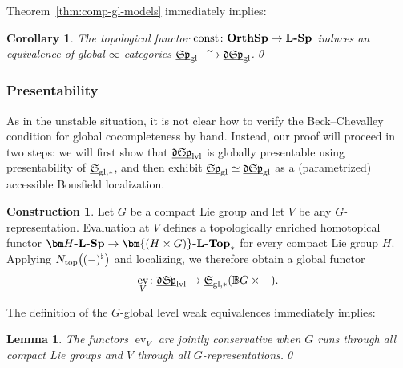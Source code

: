 \documentclass[reqno]{memo-l}
\theoremstyle{mythm}
\newtheorem{lemma}[thm]{Lemma}
\newtheorem{cor}[thm]{Corollary}
\theoremstyle{definition}
\newtheorem{constr}[thm]{Construction}
\numberwithin{equation}{section}
\newcommand{\gl}{\textup{gl}}
\DeclareMathOperator{\ev}{ev}
\newcommand{\Ntop}{{N_\textup{top}}}
\newcommand{\cat}[1]{\textbf{\textup{#1}}}
\newcommand{\consts}{\textup{const}}
\newcommand{\dual}{\flat}
\newcommand{\BGcat}[1]{\mathbb B{#1}}
\newcommand{\ulhelper}[2]{\underline{\setbox0=\hbox{$#1#2$}\dp0=0.4pt \box0\relax}}
\newcommand{\ul}[1]{{\mathpalette\ulhelper{#1}}\hbox{\rule[-2pt]{0pt}{0pt}}}
\newcommand{\iso}{\xrightarrow{\;\smash{\raisebox{-0.25ex}{\ensuremath{\scriptstyle\sim}}}\;}}
\newcommand{\mySp}{{\mathfrak S\kern-.5pt\mathfrak p}}
\newcommand{\myLSp}{{\mathfrak d\kern-.25pt}\mySp}
\newcommand{\ulmySplev}{\ul{\myLSp}_\textup{lvl}}
\newcommand{\myS}{{{\mathfrak S\kern-.4pt}}}
\newcommand{\osp}{{\textbf{\textup{OrthSp}}}}
\begin{document}
Theorem~\ref{thm:comp-gl-models} immediately implies:

\begin{cor}\label{cor:LSp-vs-Sp-param}
    The topological functor $\consts\colon\osp\to\cat{$\cat{L}$-Sp}$ induces an equivalence of global $\infty$-categories $\ul\mySp_\gl\iso\ul\myLSp_\gl$.\qed
\end{cor}

\subsubsection{Presentability} As in the unstable situation, it is not clear how to verify the Beck--Chevalley condition for global cocompleteness by hand. Instead, our proof will proceed in two steps: we will first show that $\ulmySplev$ is globally presentable using presentability of $\ul\myS_{\gl,*}$, and then exhibit $\ul\mySp_\gl\simeq\ul\myLSp_\gl$ as a (parametrized) accessible Bousfield localization.

\begin{constr}
    Let $G$ be a compact Lie group and let $V$ be any $G$-representation. Evaluation at $V$ defines a topologically enriched homotopical functor $\cat{$\bm H$-$\cat{L}$-Sp}\to\cat{$\bm{(H\times G)}$-$\cat{L}$-Top}_*$ for every compact Lie group $H$. Applying $\Ntop\big((-)^\dual\big)$ and localizing, we therefore obtain a global functor 
    \[
        \ev_V\colon\ulmySplev\to\ul\myS_{\gl,*}(\BGcat{G}\times-).
    \]
\end{constr}

The definition of the $G$-global level weak equivalences immediately implies:

\begin{lemma}\label{lemma:ev-V-jointly-repr}
    The functors $\ev_V$ are jointly conservative when $G$ runs through all compact Lie groups and $V$ through all $G$-representations.\qed
\end{lemma}
\end{document}
